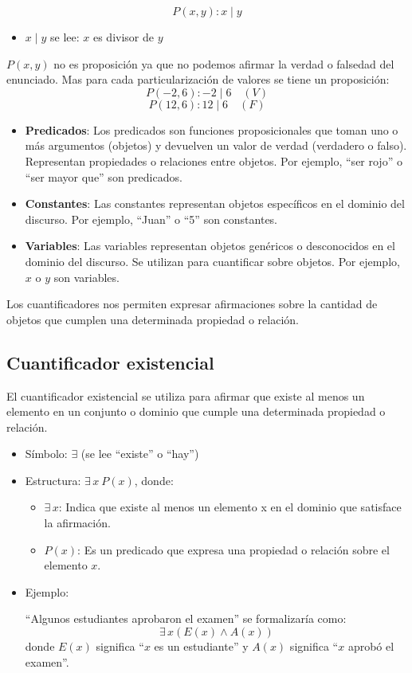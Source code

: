 \begin{fmd-example}
	\[ P(x, y): x \mid y \]
	
	\begin{itemize}
		\item $x \mid y$ se lee: $x$ es divisor de $y$
	\end{itemize}
	
	$P(x, y)$ no es proposición ya que no podemos afirmar la verdad o falsedad del enunciado. Mas para cada particularización de valores se tiene un proposición:
	\[ 
	P(-2, 6): -2 \mid 6 \quad (V)
	\]
	\[ P(12, 6): 12 \mid 6 \quad (F) \]
\end{fmd-example}

\begin{itemize}
	\item \textbf{Predicados}: Los predicados son funciones proposicionales que toman uno o más argumentos (objetos) y devuelven un valor de verdad (verdadero o falso). Representan propiedades o relaciones entre objetos. Por ejemplo, ``ser rojo'' o ``ser mayor que'' son predicados.
	\item \textbf{Constantes}: Las constantes representan objetos específicos en el dominio del discurso. Por ejemplo, ``Juan'' o ``5'' son constantes.
	\item \textbf{Variables}: Las variables representan objetos genéricos o desconocidos en el dominio del discurso. Se utilizan para cuantificar sobre objetos. Por ejemplo, $x$ o $y$ son variables.
\end{itemize}

Los cuantificadores nos permiten expresar afirmaciones sobre la cantidad de objetos que cumplen una determinada propiedad o relación.

\subsection{Cuantificador existencial}
El cuantificador existencial se utiliza para afirmar que existe al menos un elemento en un conjunto o dominio que cumple una determinada propiedad o relación.
\begin{itemize}
	\item Símbolo: $\exists$ (se lee ``existe'' o ``hay'')
	\item Estructura: $\exists \, x \ P(x)$, donde:
	\begin{itemize}
		\item $\exists \, x$: Indica que existe al menos un elemento x en el dominio que satisface la afirmación.
		\item $P(x)$: Es un predicado que expresa una propiedad o relación sobre el elemento $x$.
	\end{itemize}
	\item Ejemplo:
	
	``Algunos estudiantes aprobaron el examen'' se formalizaría como: \[\exists \, x \left( E(x) \land A(x) \right)\] donde $E(x)$ significa ``$x$ es un estudiante'' y $A(x)$ significa ``$x$ aprobó el examen''.
\end{itemize}

